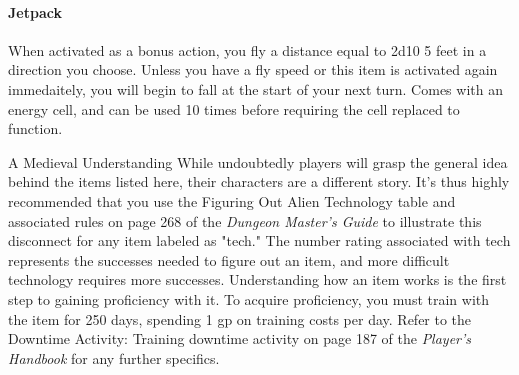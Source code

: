 \documentclass[10pt,a4paper,twoside,twocolumn,openany,nodeprecatedcode,bg=print]{dndbook}
\begin{document}
\paragraph{Jetpack}
When activated as a bonus action, you fly a distance equal to 2d10 \texttimes{} 5 feet in a direction you choose. Unless you have a fly speed or this item is activated again immedaitely, you will begin to fall at the start of your next turn. Comes with an energy cell, and can be used 10 times before requiring the cell replaced to function.
\begin{DndComment}{A Medieval Understanding}
While undoubtedly players will grasp the general idea behind the items listed here, their characters are a different story. It's thus highly recommended that you use the Figuring Out Alien Technology table and associated rules on page 268 of the \textit{Dungeon Master's Guide} to illustrate this disconnect for any item labeled as "tech." The number rating associated with tech represents the successes needed to figure out an item, and more difficult technology requires more successes.
Understanding how an item works is the first step to gaining proficiency with it. To acquire proficiency, you must train with the item for 250 days, spending 1 gp on training costs per day. Refer to the Downtime Activity: Training downtime activity on page 187 of the \textit{Player's Handbook} for any further specifics.
\end{DndComment}
\end{document}
